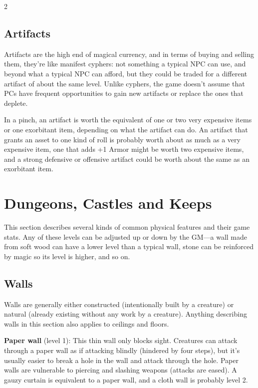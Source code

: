 \begin{multicols}{2}
\subsection{Artifacts}

Artifacts are the high end of magical currency, and in terms of buying and selling them, they’re like manifest cyphers: not something a typical NPC can use, and beyond what a typical NPC can afford, but they could be traded for a different artifact of about the same level. Unlike cyphers, the game doesn’t assume that PCs have frequent opportunities to gain new artifacts or replace the ones that deplete. 

In a pinch, an artifact is worth the equivalent of one or two very expensive items or one exorbitant item, depending on what the artifact can do. An artifact that grants an asset to one kind of roll is probably worth about as much as a very expensive item, one that adds +1 Armor might be worth two expensive items, and a strong defensive or offensive artifact could be worth about the same as an exorbitant item.

\section{Dungeons, Castles and Keeps}

This section describes several kinds of common physical features and their game stats. Any of these levels can be adjusted up or down by the GM—a wall made from soft wood can have a lower level than a typical wall, stone can be reinforced by magic so its level is higher, and so on.

\subsection{Walls}

Walls are generally either constructed (intentionally built by a creature) or natural (already existing without any work by a creature). Anything describing walls in this section also applies to ceilings and floors. 

\textbf{Paper wall} (level 1): This thin wall only blocks sight. Creatures can attack through a paper wall as if attacking blindly (hindered by four steps), but it’s usually easier to break a hole in the wall and attack through the hole. Paper walls are vulnerable to piercing and slashing weapons (attacks are eased). A gauzy curtain is equivalent to a paper wall, and a cloth wall is probably level 2. 


\end{multicols}

